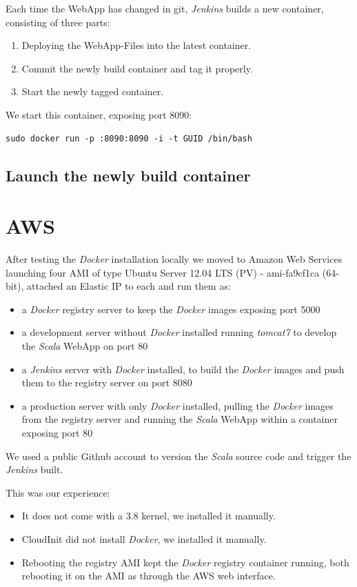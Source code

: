 \documentclass[11pt]{article}
\begin{document}
Each time the WebApp has changed in git, \emph{Jenkins} builds a new container,  consisting of three parts:
\begin{enumerate}
\item Deploying the WebApp-Files into the latest container.
\item Commit the newly build container and tag it properly.
\item Start the newly tagged container.
\end{enumerate}

We start this container, exposing port 8090:

\begin{verbatim}
sudo docker run -p :8090:8090 -i -t GUID /bin/bash
\end{verbatim}
\subsection{Launch the newly build container}
\label{sec-5-4}
\section{AWS}
\label{sec-6}

After testing the \emph{Docker} installation locally we moved to Amazon Web Services launching four AMI  of type Ubuntu Server 12.04 LTS (PV) - ami-fa9cf1ca (64-bit), attached an Elastic IP to each and run them as:
\begin{itemize}
\item a \emph{Docker} registry server to keep the \emph{Docker} images exposing port 5000
\item a development server  without \emph{Docker} installed running \emph{tomcat7} to develop the  \emph{Scala} WebApp on port 80
\item a \emph{Jenkins} server with \emph{Docker} installed, to build the \emph{Docker} images and push them to the registry server on port 8080
\item a production server with only \emph{Docker} installed, pulling the \emph{Docker} images from the registry server and running the  \emph{Scala} WebApp within a container exposing port 80
\end{itemize}
We used a public Github account to version the \emph{Scala} source code and trigger the \emph{Jenkins} built.

This was our experience:
\begin{itemize}
\item It does not come with a 3.8 kernel, we installed it  manually.
\item CloudInit did not install \emph{Docker}, we installed it  manually.
\item Rebooting the registry AMI kept the \emph{Docker} registry container running, both rebooting it on the AMI as through the AWS web interface.
\end{itemize}
\end{document}
